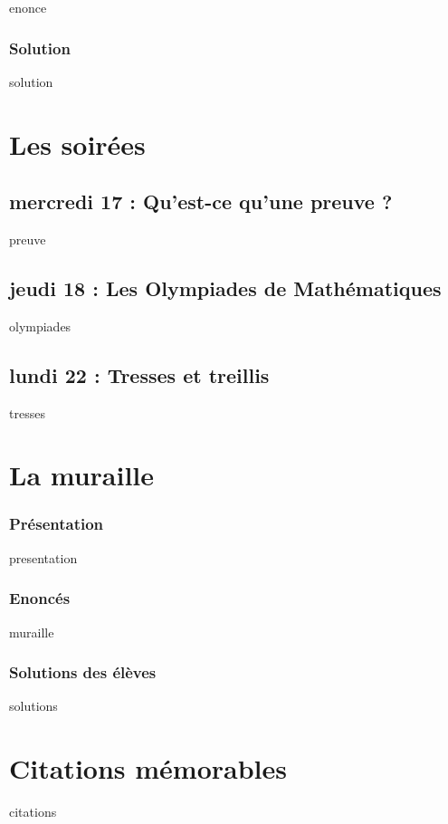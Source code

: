 \documentclass[12pt,A4]{book}
\theoremstyle{definition}
\theoremstyle{thm}
\theoremstyle{def}
\newcounter{sol}[subsection]
\begin{document}
{enonce}

\subsection{Solution}

{solution}


\chapter{Les soirées}
\minitoc \bigskip


\section{mercredi 17 : Qu'est-ce qu'une preuve ?}

{preuve}



\section{jeudi 18 : Les Olympiades de Mathématiques}

{olympiades}

\section{lundi 22 : Tresses et treillis}
{tresses}





\chapter{La muraille}
\minitoc \bigskip



\subsection{Présentation}

{presentation}

\subsection{Enoncés}

{muraille}

\subsection{Solutions des élèves}

{solutions}




\chapter{Citations mémorables}

{citations}
\end{document}

